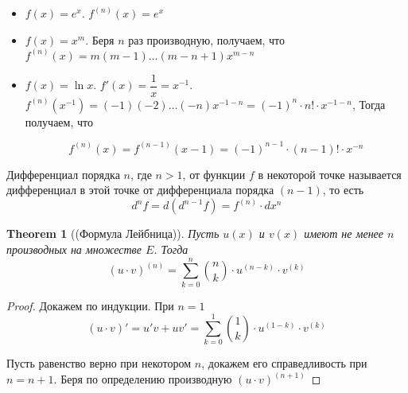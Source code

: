 \documentclass[a4paper]{article}
\theoremstyle{named}
\newtheorem*{namedtheorem}{Theorem}
\begin{document}
\begin{colloq}
\begin{itemize}
			\item
			$f(x) = e^x$. $f^{(n)}(x) = e^x$

			\item
			$f(x) = x^m$. Беря $n$ раз производную, получаем, что $f^{(n)}(x) = m(m - 1) \dots (m - n + 1)x^{m - n}$

			\item
			$f(x) = \ln x$. $f'(x) = \dfrac{1}{x} = x^{-1}$. $f^{(n)}(x^{-1}) = (-1)(-2)\dots(-n)x^{-1-n} = (-1)^n \cdot n! \cdot x^{-1 - n}$, Тогда получаем, что

			\begin{equation*}
				f^{(n)}(x) = f^{(n - 1)}(x - 1) = (-1)^{n - 1} \cdot (n - 1)! \cdot x^{-n}
			\end{equation*}
		\end{itemize}

		Дифференциал порядка $n$, где $n > 1$, от функции $f$ в некоторой точке называется дифференциал в этой точке от дифференциала порядка $(n - 1)$, то есть
		\begin{equation*}
			d^n f = d(d^{n - 1}f) = f^{(n)} \cdot dx^n
		\end{equation*}

		\begin{namedtheorem}[(Формула Лейбница)]
			Пусть $u(x)$ и $v(x)$ имеют не менее $n$ производных на множестве $E$. Тогда
			\begin{equation*}
				(u \cdot v)^{(n)} = \sum_{k = 0}^n \binom{n}{k} \cdot u^{(n - k)} \cdot v^{(k)}
			\end{equation*}
		\end{namedtheorem}

		\begin{proof}
			Докажем по индукции. При $n = 1$
			\begin{equation*}
				(u \cdot v)' = u'v + uv' = \sum_{k = 0}^1 \binom{1}{k} \cdot u^{(1 - k)} \cdot v^{(k)}
			\end{equation*}

			Пусть равенство верно при некотором $n$, докажем его справедливость при $n = n + 1$. Беря по определению производную $(u \cdot v)^{(n + 1)}$


\end{proof}
\end{colloq}
\end{document}
